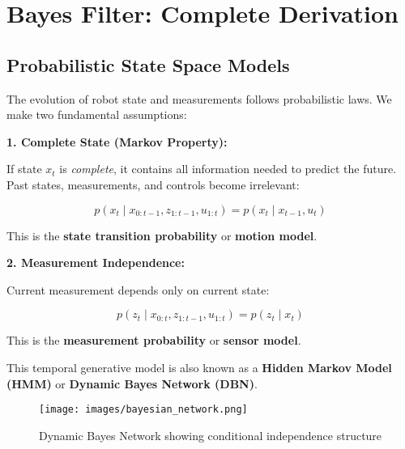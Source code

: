 \section{Bayes Filter: Complete Derivation}

\subsection{Probabilistic State Space Models}

The evolution of robot state and measurements follows probabilistic laws. We make two fundamental assumptions:

\begin{tcolorbox}[colback=green!5!white,colframe=green!60!black,title=Conditional Independence Assumptions]

\textbf{1. Complete State (Markov Property):}

If state $x_t$ is \textit{complete}, it contains all information needed to predict the future. Past states, measurements, and controls become irrelevant:

\begin{equation}
  p(x_t \mid x_{0:t-1}, z_{1:t-1}, u_{1:t}) = p(x_t \mid x_{t-1}, u_t)
  \label{eq:markov_motion}
\end{equation}

This is the \textbf{state transition probability} or \textbf{motion model}.

\vspace{3mm}
\textbf{2. Measurement Independence:}

Current measurement depends only on current state:

\begin{equation}
  p(z_t \mid x_{0:t}, z_{1:t-1}, u_{1:t}) = p(z_t \mid x_t)
  \label{eq:markov_measurement}
\end{equation}

This is the \textbf{measurement probability} or \textbf{sensor model}.

\end{tcolorbox}

This temporal generative model is also known as a \textbf{Hidden Markov Model (HMM)} or \textbf{Dynamic Bayes Network (DBN)}.

\begin{figure}[H]
  \centering
	\texttt{[image: images/bayesian\_network.png]}
	\caption{Dynamic Bayes Network showing conditional independence structure}
\end{figure}

